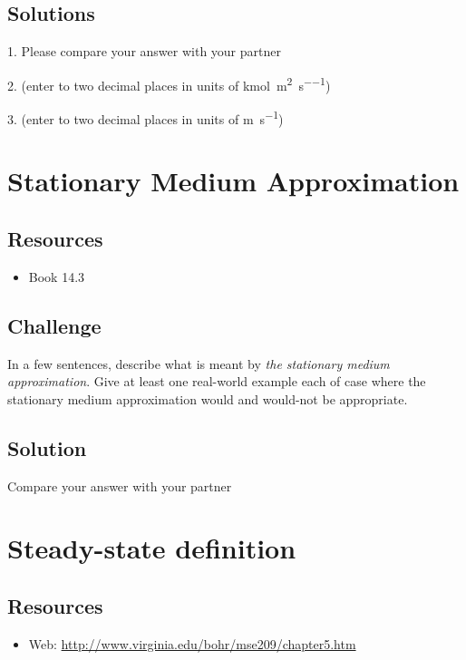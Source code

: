 \subsection*{Solutions}
1. Please compare your answer with your partner

2. (enter to two decimal places in units of \si{\kmol\per\square\meter\per\second}) 

3. (enter to two decimal places in units of \si{\meter\per\second}) 




\newpage
\section{Stationary Medium Approximation}

\subsection*{Resources}
\begin{itemize}
    \item Book 14.3
\end{itemize}

\subsection*{Challenge}
In a few sentences, describe what is meant by \emph{the stationary medium approximation}. Give at least one real-world example each of case where the stationary medium approximation would and would-not be appropriate.

\subsection*{Solution}
Compare your answer with your partner




\newpage
\section{Steady-state definition}

\subsection*{Resources}
\begin{itemize}
    \item Web: \url{http://www.virginia.edu/bohr/mse209/chapter5.htm}
\end{itemize}

